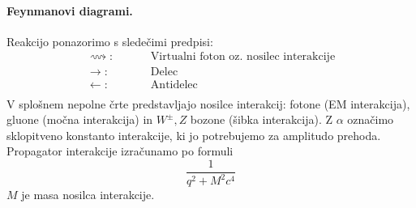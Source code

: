 \documentclass[a4paper]{article}
\begin{document}
\paragraph{Feynmanovi diagrami.} Reakcijo ponazorimo s sledečimi predpisi:
\begin{align*}
    \longrightsquigarrow: & \hspace{1cm}\text{Virtualni foton oz. nosilec interakcije} \\
    \longrightarrow: & \hspace{1cm}\text{Delec} \\
    \longleftarrow: & \hspace{1cm}\text{Antidelec} \\
\end{align*}
V splošnem nepolne črte predstavljajo nosilce interakcij: fotone (EM  interakcija), gluone (močna interakcija) in \(W^\pm,Z\) bozone (šibka interakcija).
Z \(\alpha\) označimo sklopitveno konstanto interakcije, ki jo potrebujemo za amplitudo prehoda. Propagator interakcije izračunamo po formuli \[\frac{1}{q^2 + M^2c^4}\]
\(M\) je masa nosilca interakcije.
\end{document}
